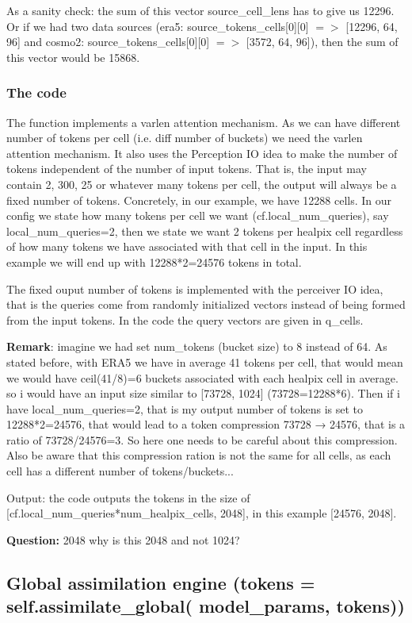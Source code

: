 \documentclass{article}
\begin{document}
As a sanity check: the sum of this vector source\_cell\_lens has to give us 12296. Or if we had two data sources (era5: source\_tokens\_cells[0][0] $=>$ [12296, 64, 96] and cosmo2: source\_tokens\_cells[0][0] $=>$ [3572, 64, 96]), then the sum of this vector would be 15868.

\subsubsection{The code}
The function implements a varlen attention mechanism. As we can have different number of tokens per cell (i.e. diff number of buckets) we need the varlen attention mechanism. It also uses the Perception IO idea to make the number of tokens independent of the number of input tokens. That is, the input may contain 2, 300, 25 or whatever many tokens per cell, the output will always be a fixed number of tokens. Concretely, in our example, we have 12288 cells. In our config we state how many tokens per cell we want (cf.local\_num\_queries), say local\_num\_queries=2, then we state we want 2 tokens per healpix cell regardless of how many tokens we have associated with that cell in the input. In this example we will end up with 12288*2=24576 tokens in total.

The fixed ouput number of tokens is implemented with the perceiver IO idea, that is the queries come from randomly initialized vectors instead of being formed from the input tokens. In the code the query vectors are given in q\_cells.

\textbf{Remark}: imagine we had set num\_tokens (bucket size) to 8 instead of 64. As stated before, with ERA5 we have in average 41 tokens per cell, that would mean we would have ceil(41/8)=6 buckets associated with each healpix cell in average. so i would have an input size similar to [73728, 1024] (73728=12288*6).  Then if i have local\_num\_queries=2, that is my output number of tokens is set to 12288*2=24576, that would lead to a token compression 73728 → 24576, that is a ratio of 73728/24576=3. So here one needs to be careful about this compression. Also be aware that this compression ration is not the same for all cells, as each cell has a different number of tokens/buckets...

Output: the code outputs the tokens in the size of [cf.local\_num\_queries*num\_healpix\_cells, 2048], in this example [24576, 2048]. 

\textbf{Question:} 2048 why is this 2048 and not 1024?

\subsection{Global assimilation engine (tokens = self.assimilate\_global( model\_params, tokens))}
\end{document}
